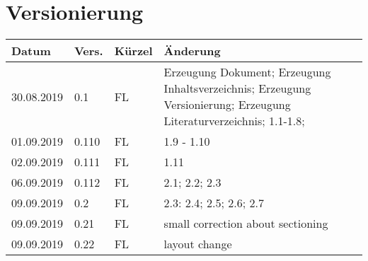 \newpage
\tableofcontents

\section*{Versionierung}
\begin{tabular}{|p{2cm}|p{1cm}|p{1.5cm}|p{12.5cm}|}\hline
Datum & Vers. & Kürzel & Änderung \\ \hline
30.08.2019 & 0.1 & FL & Erzeugung Dokument; Erzeugung Inhaltsverzeichnis; Erzeugung Versionierung; Erzeugung Literaturverzeichnis; 1.1-1.8;\\ \hline
01.09.2019 & 0.110 & FL & 1.9 - 1.10 \\ \hline
02.09.2019 & 0.111 & FL & 1.11 \\ \hline
06.09.2019 & 0.112 & FL & 2.1; 2.2; 2.3 \\ \hline
09.09.2019 & 0.2 & FL & 2.3: 2.4; 2.5; 2.6; 2.7 \\ \hline
09.09.2019 & 0.21 & FL & small correction about sectioning \\ \hline
09.09.2019 & 0.22 & FL & layout change \\ \hline
\end{tabular}
\listoffigures